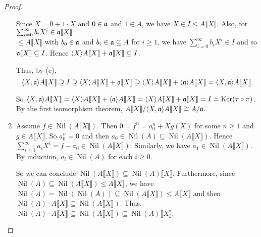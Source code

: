 \begin{proof}
\begin{enumerate}
            Since $X = 0 + 1 \cdot X$ and $0 \in \mathfrak{a}$ and $1\in A$, we have $X \in I \leq A\llbracket X \rrbracket$. Also, for $\sum_{i=0}^\infty b_iX^i \in \mathfrak{a} \llbracket X \rrbracket$ \\
            $\leq A \llbracket X \rrbracket$ with $b_0 \in \mathfrak{a}$ and $b_i \in \mathfrak{a} \subseteq A$ for $i \geq 1$, we have $\sum_{i=0}^\infty b_iX^i \in I$ and so $\mathfrak{a} \llbracket X \rrbracket \subseteq I$. Hence $\langle X \rangle A\llbracket X \rrbracket + \mathfrak{a}\llbracket X \rrbracket \subseteq I$. \par
            Thus, by (c),
            \[\langle X,\mathfrak{a} \rangle A\llbracket X \rrbracket \supseteq I \supseteq \langle X \rangle A\llbracket X \rrbracket + \mathfrak{a} \llbracket X \rrbracket \supseteq \langle X \rangle A\llbracket X \rrbracket + \langle \mathfrak{a} \rangle A\llbracket X \rrbracket = \langle X,\mathfrak{a} \rangle A\llbracket X \rrbracket.\] 
            \par So $\langle X,\mathfrak{a} \rangle A\llbracket X \rrbracket = \langle X \rangle A \llbracket X \rrbracket + \langle \mathfrak{a} \rangle A\llbracket X \rrbracket = \langle X \rangle A\llbracket X \rrbracket + \mathfrak{a} \llbracket X \rrbracket = I = \operatorname{Ker}(\tau \circ \pi)$. By the first isomorphism theorem, $A\llbracket X \rrbracket / \langle X,\mathfrak{a} \rangle A \llbracket X \rrbracket \cong A/\mathfrak{a}$. 
        \item 
            Assume $f \in \operatorname{Nil}(A\llbracket X \rrbracket)$. Then $0 = f^n = a_0^n + Xg(X)$ for some $n \geq 1$ and $g \in A\llbracket X \rrbracket$. So $a_0^n = 0$ and then $a_0 \in \operatorname{Nil}(A) \subseteq \operatorname{Nil}(A\llbracket X \rrbracket)$. Hence $\sum_{i=1}^\infty a_iX^i = f-a_0 \in \operatorname{Nil}(A \llbracket X \rrbracket)$. Similarly, we have $a_1 \in \operatorname{Nil}(A\llbracket X \rrbracket)$. By induction, $a_i \in \operatorname{Nil}(A)$ for each $i \geq 0$. \par 
            So we can conclude $\operatorname{Nil}(A\llbracket X \rrbracket) \subseteq \operatorname{Nil}(A)\llbracket X \rrbracket$. Furthermore, since $\operatorname{Nil}(A) \subseteq \operatorname{Nil}(A\llbracket X \rrbracket) \leq A \llbracket X \rrbracket$, we have $\operatorname{Nil}(A) = \operatorname{Nil}(\operatorname{Nil}(A)) \subseteq \operatorname{Nil}(A\llbracket X \rrbracket) \leq A\llbracket X \rrbracket$ and then $\operatorname{Nil}(A) \cdot A\llbracket X \rrbracket \subseteq \operatorname{Nil}(A\llbracket X \rrbracket)$. Thus, $\operatorname{Nil}(A) \cdot A\llbracket X \rrbracket \subseteq \operatorname{Nil}(A\llbracket X \rrbracket) \subseteq \operatorname{Nil}(A)\llbracket X \rrbracket$. \par 

\end{enumerate}
\end{proof}
